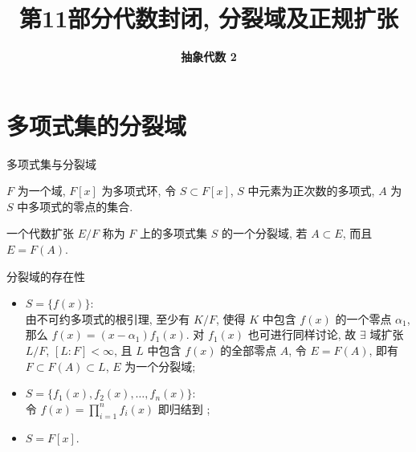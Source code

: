 \everymath{\displaystyle}



\title[代数封闭,\\ 分裂域及正规扩张]{\texorpdfstring{\LARGE \bfseries 第11部分\quad 代数封闭, 分裂域及正规扩张}{第11部分 代数封闭, 分裂域及正规扩张}}
\author[抽象代数 2]{\Large \bfseries 抽象代数 2}
\date{}





\begin{frame}

\titlepage %

\end{frame}


\section[分裂域]{多项式集的分裂域}


\begin{frame}{多项式集与分裂域}

$F$ 为一个域, $F[x]$ 为多项式环, 令 $S \subset F[x]$,
$S$ 中元素为正次数的多项式, $A$ 为 $S$ 中多项式的零点的集合.

\pause

\begin{Def}[分裂域]
一个代数扩张 $E/F$ 称为 $F$ 上的多项式集 $S$ 的一个分裂域,
若 $A \subset E$, 而且 $E = F(A)$.
\end{Def}

\end{frame}


\begin{frame}{分裂域的存在性}

\begin{itemize}
\item {} $S = \{ f(x) \}$:\\
  由不可约多项式的根引理, 至少有 $K/F$, 使得 $K$ 中包含 $f(x)$ 的一个零点
  $\alpha_1$, 那么 $f(x) = (x - \alpha_1) f_1(x)$.
  对 $f_1(x)$ 也可进行同样讨论,
  故 $\exists$ 域扩张 $L/F$, $[L:F] < \infty$, 且 $L$ 中包含 $f(x)$ 的全部零点
  $A$, 令 $E = F(A)$, 即有 $F \subset F(A) \subset L$, $E$ 为一个分裂域;
\item {} $S = \{ f_1(x), f_2(x), \dots, f_n(x) \}$:\\
  令 $f(x) = \prod_{i=1}^{n} f_i(x)$ 即归结到 ;
\item {} $S = F[x]$.
\end{itemize}

\end{frame}

